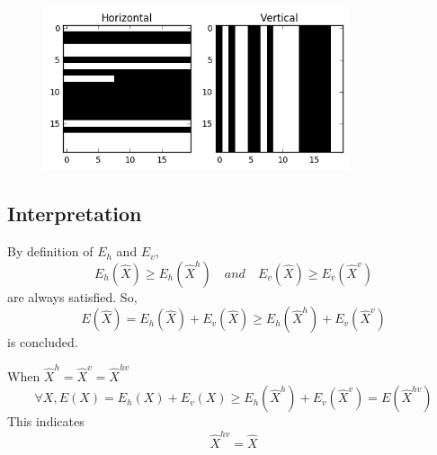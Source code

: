 \documentclass[12pt,a4paper]{scrartcl}
\begin{document}
\begin{figure}
    \includegraphics[width=9cm]{result6.png}
\end{figure}

\subsection{Interpretation}
By definition of \(E_{h}\) and \(E_{v}\),
\[
E_{h}(\hat{X}) \geq E_{h}(\hat{X}^h)
\quad and \quad 
E_{v}(\hat{X}) \geq E_{v}(\hat{X}^v)
\]
are always satisfied. So, 
\[
E(\hat{X}) = E_{h}(\hat{X}) + E_{v}(\hat{X}) \geq E_{h}(\hat{X}^h) + E_{v}(\hat{X}^v)
\]
is concluded.


When \(\hat{X}^h = \hat{X}^v = \hat{X}^{hv}\)
\[
\forall X, E(X)=E_{h}(X)+E_{v}(X) \geq E_{h}(\hat{X}^h) + E_{v}(\hat{X}^v)=E(\hat{X}^{hv})
\]
This indicates
\[
\hat{X}^{hv} = \hat{X}
\]

% 
\end{document}
